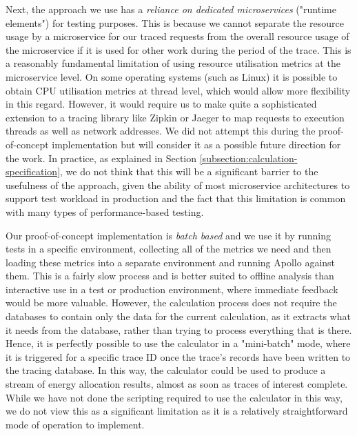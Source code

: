 Next, the approach we use has a \emph{reliance on dedicated microservices} ("runtime elements") for testing purposes.  This is because we cannot separate the resource usage by a microservice for our traced requests from the overall resource usage of the microservice if it is used for other work during the period of the trace.  This is a reasonably fundamental limitation of using resource utilisation metrics at the microservice level.  On some operating systems (such as Linux) it is possible to obtain CPU utilisation metrics at thread level, which would allow more flexibility in this regard.  However, it would require us to make quite a sophisticated extension to a tracing library like Zipkin or Jaeger to map requests to execution threads as well as network addresses.  We did not attempt this during the proof-of-concept implementation but will consider it as a possible future direction for the work.  In practice, as explained in Section \ref{subsection:calculation-specification}, we do not think that this will be a significant barrier to the usefulness of the approach, given the ability of most microservice architectures to support test workload in production and the fact that this limitation is common with many types of performance-based testing.

Our proof-of-concept implementation is \emph{batch based} and we use it by running tests in a specific environment, collecting all of the metrics we need and then loading these metrics into a separate environment and running Apollo against them.  This is a fairly slow process and is better suited to offline analysis than interactive use in a test or production environment, where immediate feedback would be more valuable. However, the calculation process does not require the databases to contain only the data for the current calculation, as it extracts what it needs from the database, rather than trying to process everything that is there.  Hence, it is perfectly possible to use the calculator in a "mini-batch" mode, where it is triggered for a specific trace ID once the trace's records have been written to the tracing database.  In this way, the calculator could be used to produce a stream of energy allocation results, almost as soon as traces of interest complete.  While we have not done the scripting required to use the calculator in this way, we do not view this as a significant limitation as it is a relatively straightforward mode of operation to implement.

